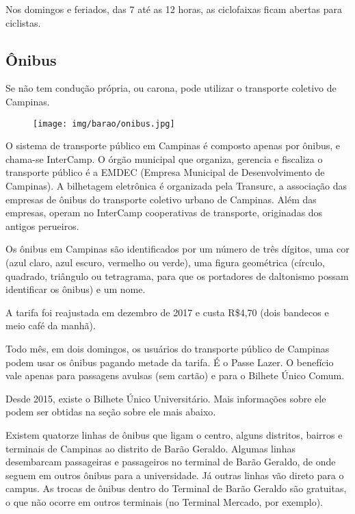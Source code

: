 Nos domingos e feriados, das 7 até as 12 horas, as ciclofaixas ficam abertas
para ciclistas.

\subsection{Ônibus}

Se não tem condução própria, ou carona, pode utilizar o transporte coletivo de
Campinas.

\begin{figure}[h!]  \centering
    \texttt{[image: img/barao/onibus.jpg]}
\end{figure}

O sistema de transporte público em Campinas é composto apenas por ônibus, e
chama-se InterCamp. O órgão municipal que organiza, gerencia e fiscaliza o
transporte público é a EMDEC (Empresa Municipal de Desenvolvimento de
Campinas). A bilhetagem eletrônica é organizada pela Transurc, a associação das
empresas de ônibus do transporte coletivo urbano de Campinas. Além das
empresas, operam no InterCamp cooperativas de transporte, originadas dos
antigos perueiros.

Os ônibus em Campinas são identificados por um número de três dígitos, uma cor
(azul claro, azul escuro, vermelho ou verde), uma figura geométrica (círculo,
quadrado, triângulo ou tetragrama, para que os portadores de daltonismo possam
identificar os ônibus) e um nome.

A tarifa foi reajustada em dezembro de 2017 e custa R\$4,70 (dois bandecos e
meio café da manhã).

Todo mês, em dois domingos, os usuários do transporte público de Campinas podem
usar os ônibus pagando metade da tarifa. É o Passe Lazer. O benefício vale
apenas para passagens avulsas (sem cartão) e para o Bilhete Único Comum.

Desde 2015, existe o Bilhete Único Universitário. Mais informações sobre ele
podem ser obtidas na seção sobre ele mais abaixo.

Existem quatorze linhas de ônibus que ligam o centro, alguns distritos, bairros
e terminais de Campinas ao distrito de Barão Geraldo. Algumas linhas
desembarcam passageiras e passageiros no terminal de Barão Geraldo, de onde
seguem em outros ônibus para a universidade. Já outras linhas vão direto para o
campus. As trocas de ônibus dentro do Terminal de Barão Geraldo são gratuitas,
o que não ocorre em outros terminais (no Terminal Mercado, por exemplo).

